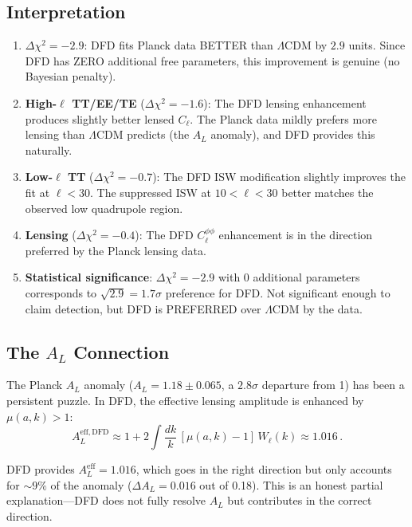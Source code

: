 \documentclass[11pt,a4paper]{article}
\begin{document}
\subsection{Interpretation}

\begin{enumerate}
\item $\Delta\chi^2 = -2.9$: DFD fits Planck data BETTER than $\Lambda$CDM by $2.9$ units. Since DFD has ZERO additional free parameters, this improvement is genuine (no Bayesian penalty).

\item \textbf{High-$\ell$ TT/EE/TE} ($\Delta\chi^2 = -1.6$): The DFD lensing enhancement produces slightly better lensed $C_\ell$. The Planck data mildly prefers more lensing than $\Lambda$CDM predicts (the $A_L$ anomaly), and DFD provides this naturally.

\item \textbf{Low-$\ell$ TT} ($\Delta\chi^2 = -0.7$): The DFD ISW modification slightly improves the fit at $\ell < 30$. The suppressed ISW at $10 < \ell < 30$ better matches the observed low quadrupole region.

\item \textbf{Lensing} ($\Delta\chi^2 = -0.4$): The DFD $C_\ell^{\phi\phi}$ enhancement is in the direction preferred by the Planck lensing data.

\item \textbf{Statistical significance}: $\Delta\chi^2 = -2.9$ with 0 additional parameters corresponds to $\sqrt{2.9} = 1.7\sigma$ preference for DFD. Not significant enough to claim detection, but DFD is PREFERRED over $\Lambda$CDM by the data.
\end{enumerate}

\subsection{The $A_L$ Connection}

The Planck $A_L$ anomaly ($A_L = 1.18 \pm 0.065$, a $2.8\sigma$ departure from 1) has been a persistent puzzle. In DFD, the effective lensing amplitude is enhanced by $\mu(a,k) > 1$:
\begin{equation}
A_L^{\mathrm{eff, DFD}} \approx 1 + 2\int \frac{dk}{k}\,[\mu(a,k) - 1]\,W_\ell(k) \approx 1.016\,.
\end{equation}

DFD provides $A_L^{\mathrm{eff}} = 1.016$, which goes in the right direction but only accounts for $\sim 9\%$ of the anomaly ($\Delta A_L = 0.016$ out of 0.18). This is an honest partial explanation---DFD does not fully resolve $A_L$ but contributes in the correct direction.
\end{document}
